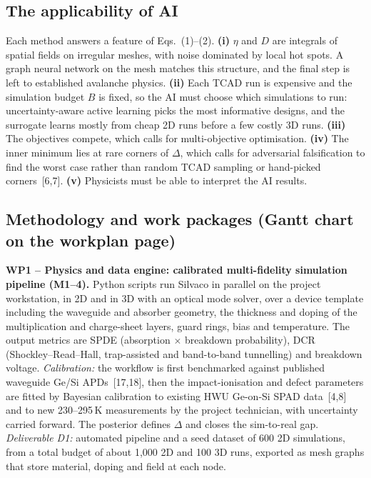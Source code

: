\documentclass[11pt,a4paper]{article}
\newcommand{\cn}[1]{\textcolor{citeblue}{[#1]}}
\begin{document}
\subsection{The applicability of AI}
Each method answers a feature of Eqs.~(1)--(2). \textbf{(i)} $\eta$ and $D$ are integrals of spatial fields on irregular meshes, with noise dominated by local hot spots. A graph neural network on the mesh matches this structure, and the final step is left to established avalanche physics. \textbf{(ii)} Each TCAD run is expensive and the simulation budget $B$ is fixed, so the AI must choose which simulations to run: uncertainty-aware active learning picks the most informative designs, and the surrogate learns mostly from cheap 2D runs before a few costly 3D runs. \textbf{(iii)} The objectives compete, which calls for multi-objective optimisation. \textbf{(iv)} The inner minimum lies at rare corners of $\Delta$, which calls for adversarial falsification to find the worst case rather than random TCAD sampling or hand-picked corners~\cn{6,7}. \textbf{(v)} Physicists must be able to interpret the AI results.

\subsection{Methodology and work packages (Gantt chart on the workplan page)}
\textbf{WP1 -- Physics and data engine: calibrated multi-fidelity simulation pipeline (M1--4).} Python scripts run Silvaco in parallel on the project workstation, in 2D and in 3D with an optical mode solver, over a device template including the waveguide and absorber geometry, the thickness and doping of the multiplication and charge-sheet layers, guard rings, bias and temperature. The output metrics are SPDE (absorption $\times$ breakdown probability), DCR (Shockley--Read--Hall, trap-assisted and band-to-band tunnelling) and breakdown voltage. \emph{Calibration:} the workflow is first benchmarked against published waveguide Ge/Si APDs~\cn{17,18}, then the impact-ionisation and defect parameters are fitted by Bayesian calibration to existing HWU Ge-on-Si SPAD data~\cn{4,8} and to new 230--295\,K measurements by the project technician, with uncertainty carried forward. The posterior defines $\Delta$ and closes the sim-to-real gap.
\emph{Deliverable D1:} automated pipeline and a seed dataset of 600 2D simulations, from a total budget of about 1,000 2D and 100 3D runs, exported as mesh graphs that store material, doping and field at each node.
\end{document}
